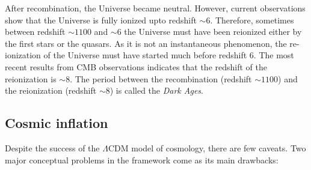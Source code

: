 After recombination, the Universe became neutral. However, current observations
show that the Universe is fully ionized upto redshift $\sim 6$. Therefore, 
sometimes between redshift $\sim 1100$ and $\sim 6$ the Universe must have been
reionized either by the first stars or the quasars. As it is not an 
instantaneous phenomenon, the re-ionization of the Universe must have
started much before redshift $6$. The most recent results from
CMB observations indicates that the redshift of the reionization is
$\sim 8$. The period between the recombination (redshift $\sim 1100$)
and the reionization (redshift $\sim 8$) is called the {\it Dark Ages}.


\subsection{Cosmic inflation}

Despite the success of the $\Lambda$CDM model of cosmology, there are few caveats.
Two major conceptual problems in the framework come as its main drawbacks:

